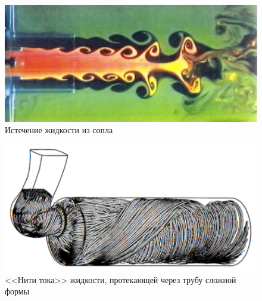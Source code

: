 \begin{figure}[htp]
\centering
\includegraphics[width = 0.7\linewidth]{historyImg/jet_small.pdf}
\caption{Истечение жидкости из сопла}
\label{}
\end{figure}

\begin{figure}[htp]
\centering
\includegraphics[width=0.7\linewidth]{historyImg/flow_small.pdf}
\caption{<<Нити тока>> жидкости, протекающей через трубу сложной формы}
\label{}
\end{figure}
\newpage
